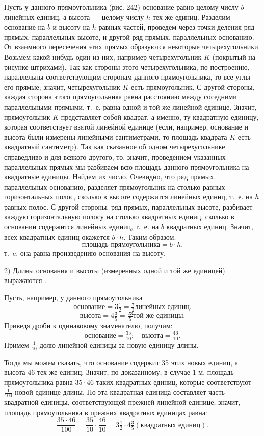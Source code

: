 \documentclass[oneside]{book}
\begin{document}
Пусть у данного прямоугольника (рис. 242) основание равно целому числу $b$ линейных единиц, а высота — целому числу $h$ тех же единиц.
Разделим основание на $b$ и высоту на $h$ равных частей, проведем через точки деления ряд прямых, параллельных высоте, и другой ряд прямых, параллельных основанию.
От взаимного пересечения этих прямых образуются некоторые четырехугольники.
Возьмем какой-нибудь один из них, например четырехугольник $K$ (покрытый на рисунке штрихами).
Так как стороны этого четырехугольника, по построению, параллельны соответствующим сторонам данного прямоугольника, то все углы его прямые;
значит, четырехугольник $K$ есть прямоугольник.
С другой стороны, каждая сторона этого прямоугольника равна расстоянию между соседними параллельными прямыми, т.~е. равна одной и той же линейной единице.
Значит, прямоугольник $K$ представляет собой квадрат, а именно, ту квадратную единицу, которая соответствует взятой линейной единице (если, например, основание и высота были измерены линейными сантиметрами, то площадь квадрата $K$ есть квадратный сантиметр).
Так как сказанное об одном четырехугольнике справедливо и для всякого другого, то, значит, проведением указанных параллельных прямых мы разбиваем всю площадь данного прямоугольника на квадратные единицы.
Найдем их число.
Очевидно, что ряд прямых, параллельных основанию, разделяет прямоугольник на столько равных горизонтальных полос, сколько в высоте содержится линейных единиц, т.~е. на $h$ равных полос.
С другой стороны, ряд прямых, параллельных высоте, разбивает каждую горизонтальную полосу на столько квадратных единиц, сколько в основании содержится линейных единиц, т.~е. на $b$ квадратных единиц.
Значит, всех квадратных единиц окажется $b\cdot h$.
Таким образом.
\[\text{площадь прямоугольника} = b\cdot h.\]
т.~e. она равна произведению основания на высоту.

2) Длины основания и высоты (измеренных одной и той же единицей) выражаются .

Пусть, например, у данного прямоугольника
\[\text{основание} = 3\tfrac12=\tfrac72 \text{линейных единиц.}\]
\[\text{высота} = 4\tfrac35 = \tfrac{23}5 \text{той же единицы.}\]
Приведя дроби к одинаковому знаменателю, получим:
\[\text{основание} = \tfrac{35}{10};
\quad
\text{высота} = \tfrac{46}{10}.
\]
Примем $\tfrac1{10}$ долю линейной единицы за новую единицу длины.

Тогда мы можем сказать, что основание содержит 35 этих новых единиц, а высота 46 тех же единиц.
Значит, по доказанному, в случае 1-м, площадь прямоугольника равна $35 \cdot 46$ таких квадратных единиц, которые соответствуют $\tfrac1{100}$ новой единице длины.
Но эта квадратная единица составляет часть квадратной единицы, соответствующей прежней линейной единице;
значит, площадь прямоугольника в прежних квадратных единицах равна:
\[\frac{35\cdot 46}{100}=\frac{35}{10}\cdot\frac{46}{10}=3\tfrac12\cdot4\tfrac35(\text{квадратных единиц}).\]
\end{document}
